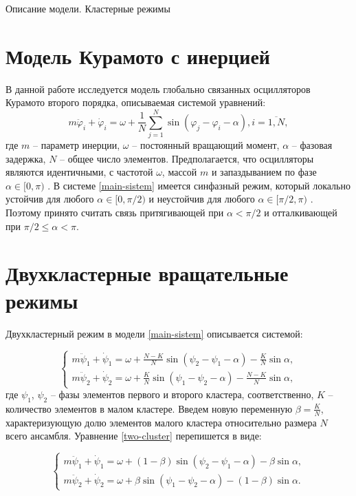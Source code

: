 \begin{chapter}{Описание модели. Кластерные режимы}
	\section{Модель Курамото с инерцией}
	В данной работе исследуется модель глобально связанных осцилляторов Курамото второго порядка, описываемая системой уравнений:
	\begin{equation} \label{main-sistem}
		m\ddot{\varphi}_i + \dot{\varphi}_i = \omega + 
		\frac{1}{N} \sum_{j = 1}^N \sin{(\varphi_j - 
		\varphi_i - \alpha)}, i = \overline{1, N}, 
	\end{equation}
	где $m$ -- параметр инерции, $\omega$ -- постоянный вращающий момент,
	$\alpha$ -- фазовая задержка, $N$ -- общее число элементов.
	Предполагается, что осцилляторы являются идентичными, с частотой $\omega$, массой $m$ и запаздыванием по
	фазе $\alpha \in [0, \pi)$ \cite{Sakaguchi} . В системе \eqref{main-sistem} имеется синфазный режим,
	который локально устойчив для любого $\alpha \in [0, \pi/2)$
	и неустойчив для любого $\alpha \in [\pi/2, \pi)$ \cite{Acebron:Bonilla}. Поэтому принято считать связь притягивающей при
	$\alpha < \pi/2$ и отталкивающей при $\pi/2 \leq \alpha < \pi$.

	\section{Двухкластерные вращательные режимы}
	
	Двухкластерный режим в модели \eqref{main-sistem} описывается системой:
	
	\begin{equation} \label{two-cluster}
		\begin{cases}
			m\ddot{\psi}_1 + \dot{\psi}_1 = \omega + \frac{N-K}{N} \sin{(\psi_2 - \psi_1 - \alpha)} - \frac{K}{N}\sin{\alpha},\\
			m\ddot{\psi}_2 + \dot{\psi}_2 = \omega + \frac{K}{N} \sin{(\psi_1 - \psi_2 - \alpha)} - \frac{N - K}{N}\sin{\alpha},
		\end{cases}
	\end{equation}
	где $\psi_1$, $\psi_2$ -- фазы элементов первого и
	второго кластера, соответственно, $K$ -- количество элементов в малом кластере.
	Введем новую переменную $\beta = \frac{K}{N}$, характеризующую долю элементов малого кластера относительно размера $N$ всего ансамбля.
	Уравнение \eqref{two-cluster} перепишется в виде:
	
	\begin{equation} \label{two-cluster-beta}
		\begin{cases}
			m\ddot{\psi}_1 + \dot{\psi}_1 = \omega + (1 - \beta) \sin{(\psi_2 - \psi_1 - \alpha)} - \beta\sin{\alpha}, \\
			m\ddot{\psi}_2 + \dot{\psi}_2 = \omega + \beta \sin{(\psi_1 - \psi_2 - \alpha)} - (1 - \beta)\sin{\alpha}.
		\end{cases}
	\end{equation}
	

\end{chapter}

